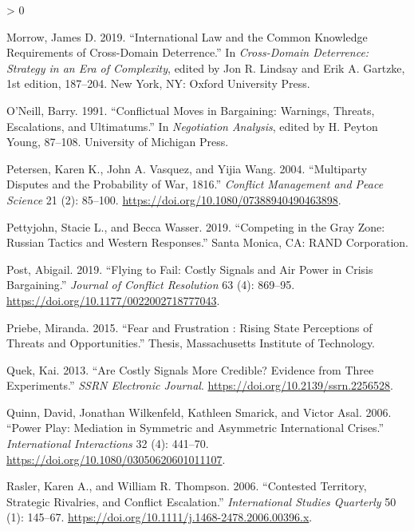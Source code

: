 \documentclass[
]{article}
\newlength{\cslhangindent}
\newenvironment{CSLReferences}[2] %
 {%
  \setlength{\parindent}{0pt}
  \ifodd #1 \everypar{\setlength{\hangindent}{\cslhangindent}}\ignorespaces\fi
  \ifnum #2 > 0
  \setlength{\parskip}{#2\baselineskip}
  \fi
 }%
 {}
\begin{document}
\begin{CSLReferences}{1}{0}
\leavevmode\hypertarget{ref-morrow_internationallawcommon_2019}{}%
Morrow, James D. 2019. {``International {Law} and the {Common Knowledge Requirements} of {Cross-Domain Deterrence}.''} In \emph{Cross-Domain Deterrence: Strategy in an Era of Complexity}, edited by Jon R. Lindsay and Erik A. Gartzke, 1st edition, 187--204. {New York, NY}: {Oxford University Press}.

\leavevmode\hypertarget{ref-oneill_conflictualmovesbargaining_1991}{}%
O'Neill, Barry. 1991. {``Conflictual Moves in Bargaining: {Warnings}, Threats, Escalations, and Ultimatums.''} In \emph{Negotiation {Analysis}}, edited by H. Peyton Young, 87--108. {University of Michigan Press}.

\leavevmode\hypertarget{ref-petersen_multipartydisputesprobability_2004}{}%
Petersen, Karen K., John A. Vasquez, and Yijia Wang. 2004. {``Multiparty {Disputes} and the {Probability} of {War}, 1816{}.''} \emph{Conflict Management and Peace Science} 21 (2): 85--100. \url{https://doi.org/10.1080/07388940490463898}.

\leavevmode\hypertarget{ref-pettyjohn_competinggrayzone_2019}{}%
Pettyjohn, Stacie L., and Becca Wasser. 2019. {``Competing in the {Gray Zone}: {Russian Tactics} and {Western Responses}.''} {Santa Monica, CA}: {RAND Corporation}.

\leavevmode\hypertarget{ref-post_flyingfailcostly_2019}{}%
Post, Abigail. 2019. {``Flying to {Fail}: {Costly Signals} and {Air Power} in {Crisis Bargaining}.''} \emph{Journal of Conflict Resolution} 63 (4): 869--95. \url{https://doi.org/10.1177/0022002718777043}.

\leavevmode\hypertarget{ref-priebe_fearfrustrationrising_2015}{}%
Priebe, Miranda. 2015. {``Fear and Frustration : Rising State Perceptions of Threats and Opportunities.''} Thesis, Massachusetts Institute of Technology.

\leavevmode\hypertarget{ref-quek_arecostlysignals_2013}{}%
Quek, Kai. 2013. {``Are {Costly Signals More Credible}? {Evidence} from {Three Experiments}.''} \emph{SSRN Electronic Journal}. \url{https://doi.org/10.2139/ssrn.2256528}.

\leavevmode\hypertarget{ref-quinn_powerplaymediation_2006}{}%
Quinn, David, Jonathan Wilkenfeld, Kathleen Smarick, and Victor Asal. 2006. {``Power {Play}: {Mediation} in {Symmetric} and {Asymmetric International Crises}.''} \emph{International Interactions} 32 (4): 441--70. \url{https://doi.org/10.1080/03050620601011107}.

\leavevmode\hypertarget{ref-rasler_contestedterritorystrategic_2006}{}%
Rasler, Karen A., and William R. Thompson. 2006. {``Contested {Territory}, {Strategic Rivalries}, and {Conflict Escalation}.''} \emph{International Studies Quarterly} 50 (1): 145--67. \url{https://doi.org/10.1111/j.1468-2478.2006.00396.x}.


\end{CSLReferences}
\end{document}
